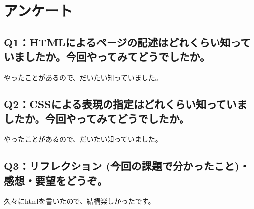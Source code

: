 \documentclass[12pt,a4j]{jarticle}
\begin{document}
\section{アンケート}

\subsection{Q1：HTMLによるページの記述はどれくらい知っていましたか。今回やってみてどうでしたか。}
やったことがあるので、だいたい知っていました。

\subsection{Q2：CSSによる表現の指定はどれくらい知っていましたか。今回やってみてどうでしたか。}
やったことがあるので、だいたい知っていました。

\subsection{Q3：リフレクション (今回の課題で分かったこと)・感想・要望をどうぞ。}
久々にhtmlを書いたので、結構楽しかったです。
\end{document}
